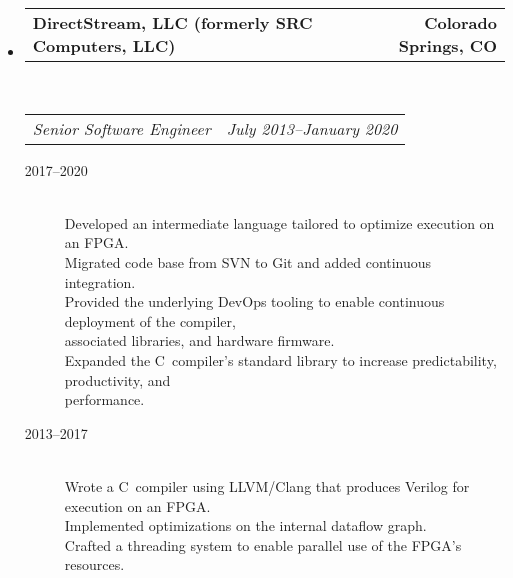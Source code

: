 \documentclass[10pt,letterpaper]{article}
\makeatletter
\newcommand{\headerrow}[2]
{\begin{tabular*}{\linewidth}{l@{\extracolsep{\fill}}r}
  #1 &
  #2 \\
\end{tabular*}}
\newcommand{\CPP}
{C\nolinebreak[4]\hspace{-.05em}\raisebox{.22ex}{\footnotesize\bf ++}}
\makeatother
\begin{document}
\begin{itemize}
  \item
  \headerrow
    {\textbf{DirectStream, LLC (formerly SRC Computers, LLC)}}
    {\textbf{Colorado Springs, CO}}
  \\
  \headerrow
    {\emph{Senior Software Engineer}}
    {\emph{July 2013--January 2020}}
  \begin{description}
    \item[2017--2020] \hfill \\
        Developed an intermediate language tailored to optimize execution on an FPGA. \\
        Migrated code base from SVN to Git and added continuous integration. \\
        Provided the underlying DevOps tooling to enable continuous deployment of the compiler, \\  associated libraries, and hardware firmware. \\
        Expanded the \CPP \  compiler's standard library to increase predictability, productivity, and \\  performance.
    \item[2013--2017] \hfill \\
        Wrote a \CPP \  compiler using LLVM/Clang that produces Verilog for execution on an FPGA. \\
        Implemented optimizations on the internal dataflow graph. \\
        Crafted a threading system to enable parallel use of the FPGA’s resources.
  \end{description}


\end{itemize}
\end{document}
